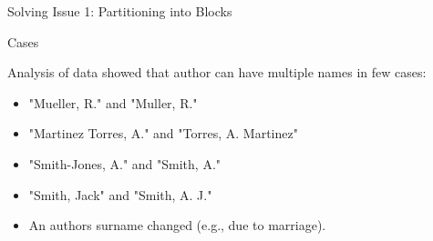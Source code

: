 \documentclass{beamer}
\begin{document}
\begin{frame} {Solving Issue 1: Partitioning into Blocks}







\end{frame}



\begin{frame} {Cases}

Analysis of data showed that author can have multiple names in few cases:

\begin {itemize}
 \item "Mueller, R." and "Muller, R."

  \item "Martinez Torres, A." and "Torres, A. Martinez"

  \item "Smith-Jones, A." and "Smith, A."

  \item "Smith, Jack" and "Smith, A. J."

  \item An authors surname changed (e.g., due to marriage).

\end {itemize}


\end{frame}

\end{document}
